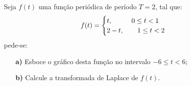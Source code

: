 \linespread{1.5}

Seja $f(t)$ uma função periódica de período $T=2$, tal que:
\begin{equation*}
    f(t) = \begin{cases}
    t, \hspace{1cm} 0\leq t < 1\\
    2-t, \hspace{0.7cm} 1\leq t< 2
    \end{cases}
\end{equation*}
pede-se:
\begin{itemize}
    \item[\textbf{a)}] Esboce o gráfico desta função no intervalo $-6\leq t < 6$;
    \item[\textbf{b)}] Calcule a transformada de Laplace de $f(t).$
\end{itemize}
